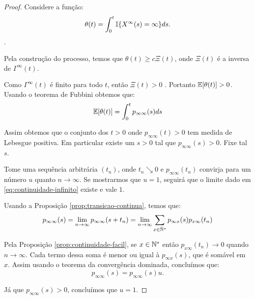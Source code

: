 \begin{proof}
  Considere a função:
  \begin{displaymath}
    \theta(t) = \int_0^t {\mathbb{I}} \{ X^\infty (s) = \infty \} ds.
  \end{displaymath}.
  
  Pela construção do processo, temos que $\theta(t) \geq c
  \Xi(t)$, onde $\Xi(t)$ é a inversa de $\Gamma^\infty(t)$.

  Como $\Gamma^\infty(t)$ é \qc finito para todo $t$, então $\Xi(t) >
  0$ \qc. Portanto ${\mathbb{E}} [\theta(t)] > 0$. Usando o teorema de Fubbini
  obtemos que:
  \begin{displaymath}
    {\mathbb{E}}[\theta(t)] =  \int_0^t p_{\infty \infty} (s) ds
  \end{displaymath}

  Assim obtemos que o conjunto dos $t > 0$ onde $p_{\infty \infty}(t)
  > 0$ tem medida de Lebesgue positiva. Em particular existe um $s >
  0$ tal que $p_{\infty \infty}(s) > 0$. Fixe tal $s$.

  Tome uma sequência arbitrária $(t_n)$, onde $t_n \searrow 0$ e
  $p_{\infty \infty} (t_n)$ convirja para um número $u$ quanto $n \to
  \infty$.  Se mostrarmos que $u = 1$, seguirá que o limite dado em
  \eqref{eq:continuidade-infinito} existe e vale $1$.


  Usando a Proposição \ref{prop:transicao-continua}, temos que:
  \begin{displaymath}
    p_{\infty\infty}(s) = \lim_{n \to \infty} p_{\infty \infty}(s+t_n) = \lim_{n \to
      \infty} \sum_{x \in {\mathbb{\bar{N}^*}}} p_{\infty x}(s) p_{x \infty} (t_n)
  \end{displaymath}

  Pela Proposição \ref{prop:continuidade-facil}, se $x \in {\mathbb{N^*}}$ então
  $p_{x \infty}(t_n) \to 0$ quando $n \to \infty$. Cada termo
  dessa soma é menor ou igual à $p_{\infty x} (s)$, que é somável em
  $x$. Assim usando o teorema da convergência dominada, concluímos
  que:
  \begin{displaymath}
    p_{\infty\infty}(s) = p_{\infty \infty}(s)u.
  \end{displaymath}

  Já que $p_{\infty \infty}(s) > 0$, concluímos que $u = 1$.
\end{proof}

